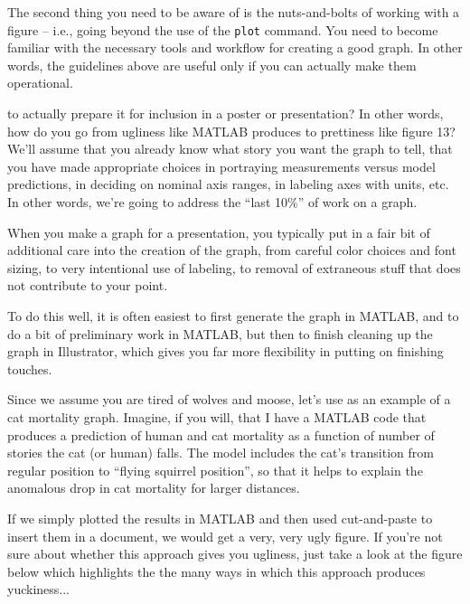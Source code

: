 The second thing you need to be aware of is the nuts-and-bolts of working with a figure -- i.e., going beyond the use of the {\tt plot} command.  You need to become familiar with the necessary tools and workflow for creating a good graph. In other words, the guidelines above are useful only if you can actually make them operational.


 to actually prepare it for inclusion in a poster or presentation?  In other words, how do you go from ugliness like MATLAB produces to prettiness like figure 13? We'll  assume that you already know what story you want the graph to tell, that you have made appropriate choices in portraying measurements versus model predictions, in deciding on nominal axis ranges, in labeling axes with units, etc. In other words, we're going to address the ``last 10\%'' of work on a graph. 

When you make a graph for a presentation, you typically put in a fair bit of additional care into the creation of the graph, from careful color choices and font sizing, to very intentional use of labeling, to removal of extraneous stuff that does not contribute to your point.

To do this well, it is often easiest to first generate the graph in MATLAB, and to do a bit of preliminary work in MATLAB, but then to finish cleaning up the graph in Illustrator, which gives you far more flexibility in putting on finishing touches.

Since we assume you are tired of wolves and moose, let's use as an example of a cat mortality graph.  Imagine, if you will, that I have a MATLAB code that produces a prediction of human and cat mortality as a function of number of stories the cat (or human) falls.  The model includes the cat's transition from regular position to ``flying squirrel position'', so that it helps to explain the anomalous drop in cat mortality for larger distances.

If we simply plotted the results in MATLAB and then used cut-and-paste to insert them in a document, we would get a very, very ugly figure.  If you're not sure about whether this approach gives you ugliness, just take a look at the figure below which highlights the the many ways in which this approach produces yuckiness...

